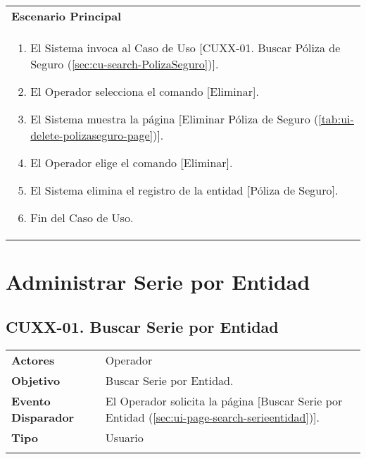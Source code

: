 \begin{tabular}{ p{15.5cm} }
	\textbf{Escenario Principal} \\
	\begin{enumerate}
		\item El Sistema invoca al Caso de Uso [CUXX-01. Buscar Póliza de Seguro (\ref{sec:cu-search-PolizaSeguro})].
		\item El Operador selecciona el comando [Eliminar].
		\item El Sistema muestra la página [Eliminar Póliza de Seguro (\ref{tab:ui-delete-polizaseguro-page})].
		\item El Operador elige el comando [Eliminar].
		\item El Sistema elimina el registro de la entidad [Póliza de Seguro].
		\item Fin del Caso de Uso.
	\end{enumerate}
\end{tabular}

\clearpage
\section{Administrar Serie por Entidad} \label{sec:cf-uc-admin-serieentidad}

\subsection{CUXX-01. Buscar Serie por Entidad} \label{sec:cu-search-SerieEntidad}

\begin{tabular}{ p{3.5cm} p{11.5cm} }
	\textbf{Actores} & Operador\\
	\textbf{Objetivo} & Buscar Serie por Entidad.\\
	\textbf{Evento Disparador} & El Operador solicita la página [Buscar Serie por Entidad (\ref{sec:ui-page-search-serieentidad})].\\
	\textbf{Tipo} & Usuario\\
	\\
\end{tabular}

